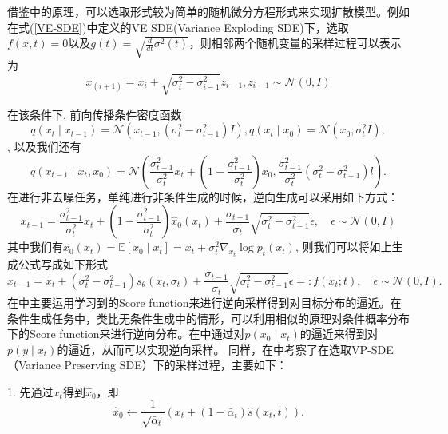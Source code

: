 借鉴\cite{DDPM}中的原理，可以选取形式较为简单的随机微分方程形式来实现扩散模型。例如在式(\ref{VE-SDE})中定义的VE SDE(Variance Exploding SDE)下，选取$f(x,t)=0$以及$g(t) = \sqrt{\frac{d}{dt}\sigma^2(t)}$，则相邻两个随机变量的采样过程可以表示为
\begin{equation}
    x_{(i+1)} = x_{i}+\sqrt{\sigma_i^2-\sigma_{i-1}^2}z_{i-1}, z_{i-1}\sim \mathcal{N}(0,I)
\end{equation}


在该条件下, 前向传播条件密度函数 
\begin{equation}
  q\left(x_t \mid x_{t-1}\right)=\mathcal{N}\left(x_{t-1},\left(\sigma_t^2-\sigma_{t-1}^2\right) I\right), q\left(x_t \mid x_0\right)=\mathcal{N}\left(x_0, \sigma_t^2 I\right),  
\end{equation}
, 以及我们还有
\begin{equation}
    q\left(x_{t-1} \mid x_t, x_0\right)=\mathcal{N}\left(\frac{\sigma_{t-1}^2}{\sigma_t^2} x_t+\left(1-\frac{\sigma_{t-1}^2}{\sigma_t^2}\right) x_0, \frac{\sigma_{t-1}^2}{\sigma_t^2}\left(\sigma_t^2-\sigma_{t-1}^2\right) l\right) .
\end{equation}
在进行非去噪任务，单纯进行非条件生成的时候，逆向生成可以采用如下方式：
\begin{equation}
    x_{t-1}=\frac{\sigma_{t-1}^2}{\sigma_t^2} x_t+\left(1-\frac{\sigma_{t-1}^2}{\sigma_t^2}\right) \hat{x}_0\left(x_t\right)+\frac{\sigma_{t-1}}{\sigma_t} \sqrt{\sigma_t^2-\sigma_{t-1}^2} \epsilon, \quad \epsilon \sim \mathcal{N}(0, I)
\end{equation}
其中我们有$\hat{x}_0\left(x_t\right)=\mathbb{E}\left[x_0 \mid x_t\right]=x_t+\sigma_t^2 \nabla_{x_t} \log p_t\left(x_t\right)$, 则我们可以将如上生成公式写成如下形式
\begin{equation}
    x_{t-1}=x_t+\left(\sigma_t^2-\sigma_{t-1}^2\right) s_\theta\left(x_t, \sigma_t\right)+\frac{\sigma_{t-1}}{\sigma_t} \sqrt{\sigma_t^2-\sigma_{t-1}^2} \epsilon=: f\left(x_t ; t\right), \quad \epsilon \sim \mathcal{N}(0, I).
    \label{reverse sampling}
\end{equation}
在\cite{song_2,DDPM}中主要运用学习到的Score function来进行逆向采样得到对目标分布的逼近。在条件生成任务中，类比无条件生成中的情形，可以利用相似的原理对条件概率分布下的Score function来进行逆向分布。在\cite{Inverse}中通过对$p(x_0\mid x_t)$的逼近来得到对$p(y\mid x_t)$的逼近，从而可以实现逆向采样。
同样，在\cite{Inverse}中考察了在选取VP-SDE（Variance Preserving SDE）下的采样过程，主要如下：      

1. 先通过$x_t$得到$\hat{x}_0$，即
\begin{equation}
    \hat{{x}}_0 \leftarrow \frac{1}{\sqrt{\bar{\alpha}_t}}\left({x}_t+\left(1-\bar{\alpha}_t\right) \hat{{s}}(x_t,t)\right).
\end{equation}
        
